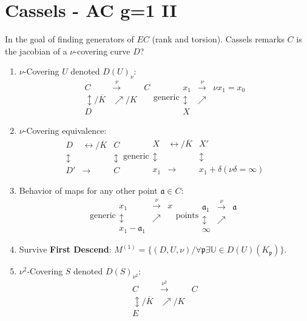\documentclass{article}
\newcommand{\af}{\mathfrak{a}}
\newcommand{\pp}{\mathfrak{p}}
\newcommand{\ra}{\rightarrow}
\newcommand{\lra}{\leftrightarrow}
\newcommand{\raa}[1]{\overset{#1}{\longrightarrow}}
\newcommand{\ACK}{\overline{K}}
\begin{document}
\section{Cassels - AC g=1 II}
\begin{multicols}{2}
In the goal of finding generators of $EC$ (rank and torsion).
Cassels remarks $C$ is the jacobian of a $\nu$-covering curve $D$?
\begin{enumerate}
\item $\nu$-Covering $U$ denoted $D(U)_\nu$:
\[\begin{array}{lll} C & \raa{\nu} & C \\\updownarrow/\ACK & \nearrow/K \\ D
\end{array} \textrm{generic}
\begin{array}{lll} x_1 & \raa{\nu} & \nu x_1 = x_0 \\\updownarrow & \nearrow \\ X \end{array}\]
\item $\nu$-Covering equivalence:
\[\begin{array}{lll} D & \lra/\ACK & C \\\updownarrow & & \updownarrow \\ D' & \ra & C \end{array} \textrm{generic} \begin{array}{lll} X & \lra/\ACK & X' \\\updownarrow & & \updownarrow \\ x_1 & \ra & x_1 + \delta (\nu \delta = \infty) \end{array} 
\]
\item Behavior of maps for any other point $\af \in C$:
\[\textrm{generic} \begin{array}{lll} x_1 & \raa{\nu} & x \\\updownarrow & \nearrow \\ x_1 - \af_1 \end{array} \textrm{points} \begin{array}{lll} \af_1 & \raa{\nu} & \af \\\updownarrow & \nearrow \\ \infty \end{array}\]

\item Survive \textbf{First Descend}: $M^{(1)} = \{(D,U,\nu)/ \forall \pp \exists \mathbb{U} \in D(U)(K_\pp)\}$.

\item $\nu^2$-Covering $S$ denoted $D(S)_{\nu^2}$:
\[\begin{array}{lll} C & \raa{\nu^2} & C \\ \updownarrow/\ACK & \nearrow/K \\ E
\end{array}\]


\end{enumerate}
\end{multicols}
\end{document}

